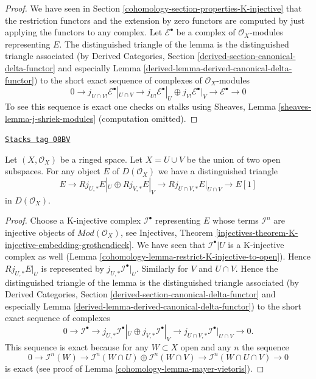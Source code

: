 \begin{proof}
We have seen in Section \ref{cohomology-section-properties-K-injective}
that the restriction functors and the extension
by zero functors are computed by just applying the functors to
any complex. Let $\mathcal{E}^\bullet$ be a complex of $\mathcal{O}_X$-modules
representing $E$. The distinguished triangle of the lemma is the
distinguished triangle associated (by
Derived Categories, Section
\ref{derived-section-canonical-delta-functor} and especially
Lemma \ref{derived-lemma-derived-canonical-delta-functor})
to the short exact sequence of complexes of $\mathcal{O}_X$-modules
$$
0 \to j_{U \cap V!}\mathcal{E}^\bullet|_{U \cap V} \to
j_{U!}\mathcal{E}^\bullet|_U \oplus j_{V!}\mathcal{E}^\bullet|_V
\to \mathcal{E}^\bullet \to 0
$$
To see this sequence is exact one checks on stalks using
Sheaves, Lemma \ref{sheaves-lemma-j-shriek-modules}
(computation omitted).
\end{proof}

\begin{lemma}
\label{cohomology-lemma-exact-sequence-j-star}
\href{https://stacks.math.columbia.edu/tag/08BV}{\texttt{Stacks tag 08BV}}

Let $(X, \mathcal{O}_X)$ be a ringed space.
Let $X = U \cup V$ be the union of two open subspaces.
For any object $E$ of $D(\mathcal{O}_X)$ we have a distinguished
triangle
$$
E \to
Rj_{U, *}E|_U \oplus Rj_{V, *}E|_V \to
Rj_{U \cap V, *}E|_{U \cap V} \to
E[1]
$$
in $D(\mathcal{O}_X)$.
\end{lemma}

\begin{proof}

Choose a K-injective complex $\mathcal{I}^\bullet$ representing $E$
whose terms $\mathcal{I}^n$ are injective objects of
$\textit{Mod}(\mathcal{O}_X)$, see Injectives, Theorem
\ref{injectives-theorem-K-injective-embedding-grothendieck}.
We have seen that $\mathcal{I}^\bullet|U$ is a K-injective complex
as well (Lemma \ref{cohomology-lemma-restrict-K-injective-to-open}). Hence
$Rj_{U, *}E|_U$ is represented by $j_{U, *}\mathcal{I}^\bullet|_U$.
Similarly for $V$ and $U \cap V$. Hence the distinguished triangle
of the lemma is the distinguished triangle associated (by
Derived Categories, Section
\ref{derived-section-canonical-delta-functor} and especially
Lemma \ref{derived-lemma-derived-canonical-delta-functor})
to the short exact sequence of complexes
$$
0 \to
\mathcal{I}^\bullet \to
j_{U, *}\mathcal{I}^\bullet|_U \oplus j_{V, *}\mathcal{I}^\bullet|_V \to
j_{U \cap V, *}\mathcal{I}^\bullet|_{U \cap V} \to
0.
$$
This sequence is exact because for any $W \subset X$ open
and any $n$ the sequence
$$
0 \to
\mathcal{I}^n(W) \to
\mathcal{I}^n(W \cap U) \oplus \mathcal{I}^n(W \cap V) \to
\mathcal{I}^n(W \cap U \cap V) \to
0
$$
is exact (see proof of Lemma \ref{cohomology-lemma-mayer-vietoris}).
\end{proof}

